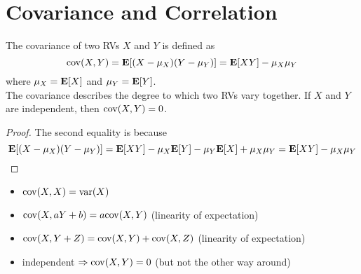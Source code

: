 \documentclass[device=normal, lang=en]{elegantbook}
\numberwithin{equation}{section}
\begin{document}
\section{Covariance and Correlation}
\begin{definition}[Covariance]
    The covariance of two RVs $X$ and $Y$ is defined as
    \begin{equation}
        \mathrm{cov}(X, Y) = \mathbf{E}[(X - \mu_X)(Y - \mu_Y)] = \mathbf{E}[XY] - \mu_X \mu_Y
    \end{equation}
    where $\mu_X = \mathbf{E}[X]$ and $\mu_Y = \mathbf{E}[Y]$. \\ 
    The covariance describes the degree to which two RVs vary together. If $X$ and $Y$ are independent, then $\mathrm{cov}(X, Y) = 0$. 
\end{definition}
\begin{proof}
    The second equality is because
    \begin{equation}
        \mathbf{E}[(X - \mu_X)(Y - \mu_Y)] = \mathbf{E}[XY] - \mu_X \mathbf{E}[Y] - \mu_Y \mathbf{E}[X] + \mu_X \mu_Y
        = \mathbf{E}[XY] - \mu_X \mu_Y
    \end{equation}
\end{proof}
\begin{property}
    \begin{itemize}
        \item $\mathrm{cov}(X, X) = \mathrm{var}(X)$
        \item $\mathrm{cov}(X, aY + b) = a \mathrm{cov}(X, Y)$ (linearity of expectation)
        \item $\mathrm{cov}(X, Y + Z) = \mathrm{cov}(X, Y) + \mathrm{cov}(X, Z)$ (linearity of expectation)
        \item independent $\Rightarrow \mathrm{cov}(X, Y) = 0$ (but not the other way around)
    \end{itemize}
\end{property}
\end{document}
